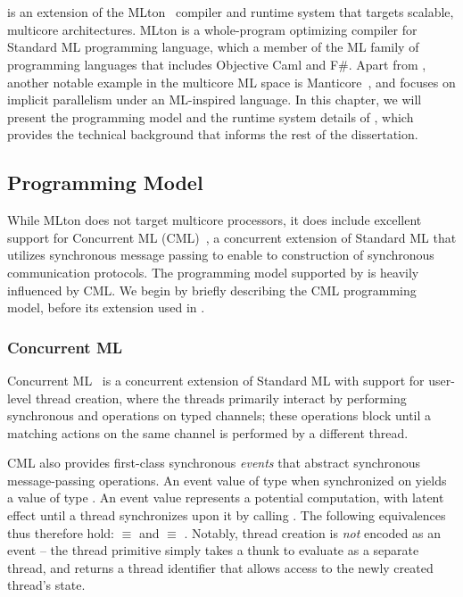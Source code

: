 \chapter{\MM}
\label{chap:mm}

\MM is an extension of the MLton~\cite{MLton} compiler and runtime system that
targets scalable, multicore architectures. MLton is a whole-program optimizing
compiler for Standard ML programming language, which a member of the ML family
of programming languages that includes Objective Caml and F\#. Apart from \MM,
another notable example in the multicore ML space is
Manticore~\cite{Fluet2007}, and focuses on implicit parallelism under an
ML-inspired language. In this chapter, we will present the programming model
and the runtime system details of \MM, which provides the technical background
that informs the rest of the dissertation.

\section{Programming Model}

While MLton does not target multicore processors, it does include excellent
support for Concurrent ML (CML)~\cite{Reppy99}, a concurrent extension of
Standard ML that utilizes synchronous message passing to enable to construction
of synchronous communication protocols. The programming model supported by \MM
is heavily influenced by CML. We begin by briefly describing the CML
programming model, before its extension used in \MM.

\subsection{Concurrent ML}

Concurrent ML~\cite{Reppy99} is a concurrent extension of Standard ML with
support for user-level thread creation, where the threads primarily interact by
performing synchronous  and  operations on typed channels;
these operations block until a matching actions on the same channel is
performed by a different thread.

CML also provides first-class synchronous {\em events} that abstract
synchronous message-passing operations.  An event value of type 
when synchronized on yields a value of type .  An event value represents
a potential computation, with latent effect until a thread synchronizes upon it
by calling . The following equivalences thus therefore hold:
 $\equiv$  and  $\equiv$
. Notably, thread creation is {\em not} encoded as an
event -- the thread  primitive simply takes a thunk to evaluate as a
separate thread, and returns a thread identifier that allows access to the
newly created thread's state.

